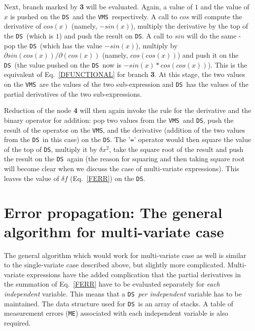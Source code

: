 \documentclass[acmtoms,acmnow]{acmtrans2m}
\newcommand{\DS}{{\tt DS}}
\newcommand{\VMS}{{\tt VMS}}
\begin{document}
Next, branch marked by {\bf 3} will be evaluated.  Again, a value of
$1$ and the value of $x$ is pushed on the \DS\ and the \VMS\ 
respectively.  A call to $cos$ will compute the derivative of $cos(x)$
(namely, $-sin(x)$), multiply the derivative by the top of the \DS\ 
(which is $1$) and push the result on \DS.  A call to $sin$ will do
the same - pop the \DS\ (which has the value $-sin(x)$), multiply by
$\partial sin(cos(x))/\partial (cos(x))$ (namely, $cos(cos(x))$) and
push it on the \DS\ (the value pushed on the \DS\ now is
$-sin(x)*cos(cos(x))$).  This is the equivalent of
Eq.~\ref{DFUNCTIONAL} for branch {\bf 3}.  At this stage, the two
values on the \VMS\ are the values of the two sub-expression and \DS\ 
has the values of the partial derivatives of the two sub-expressions.

Reduction of the node {\bf 4} will then again invoke the rule for the
derivative and the binary operator for addition: pop two values from
the \VMS\ and \DS, push the result of the operator on the \VMS, and
the derivative (addition of the two values from the \DS\ in this case)
on the \DS.  The '{\tt=}' operator would then square the value of the
top of \DS, multiply it by $\delta x^2$, take the square root of the
result and push the result on the \DS\ again (the reason for squaring
and then taking square root will become clear when we discuss the case
of multi-variate expressions).  This leaves the value of $\delta f$
(Eq.~\ref{FERR}) on the \DS.

\section{Error propagation: The general algorithm for multi-variate case}
\label{SEC:MULTI_VAR}

The general algorithm which would work for multi-variate case as well
is similar to the single-variate case described above, but slightly
more complicated.  Multi-variate expressions have the added
complication that the partial derivatives in the summation of
Eq.~\ref{FERR} have to be evaluated separately for {\it each
  independent} variable.  This means that a \DS\ {\it per independent}
variable has to be maintained.  The data structure used for \DS\ is an
array of stacks.  A table of measurement errors ({\tt ME}) associated
with each independent variable is also required.
\end{document}
